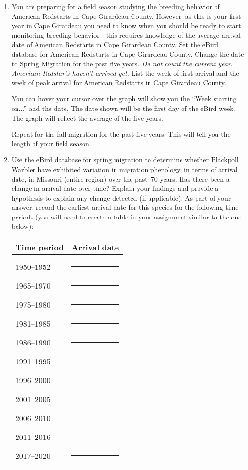 \documentclass[12pt]{article}
\begin{document}
\begin{enumerate}
\item You are preparing for a field season studying the breeding behavior
of American Redstarts in Cape Girardeau County. However, as this is your
first year in Cape Girardeau you need to know when you should be ready
to start monitoring breeding behavior---this requires knowledge of the
average arrival date of American Redstarts in Cape Girardeau County. Set
the eBird database for American Redstarts in Cape Girardeau County. Change the date to Spring Migration for the past five years. \emph{Do not count the current year. American Redstarts haven't arrived yet.} List
the week of first arrival and the week of peak arrival for American Redstarts in Cape Girardeau County.  

You can hover your cursor over the graph will show you the “Week starting on...” and the date. The date shown will be the first day of the eBird week. The graph will reflect the average of the five years.

Repeat for the fall migration for the past five years. This will tell you the length of your field season.


\item Use the eBird database for spring migration to determine
whether Blackpoll Warbler have exhibited variation in migration
phenology, in terms of arrival date, in Missouri (entire region) over the past~70 years.
Has there been a change in arrival date over time? Explain your findings
and provide a hypothesis to explain any change detected (if applicable).
As part of your answer, record the earliest arrival date for this
species for the following time periods (you will need to create a table
in your assignment similar to the one below):

\begin{longtable}[]{@{}ll@{}}
\toprule
Time period & Arrival date\tabularnewline
\midrule
\endhead
& \tabularnewline[-6pt]
1950–1952 & \rule{2cm}{0.4pt}\tabularnewline[0.5em]
1965–1970 & \rule{2cm}{0.4pt}\tabularnewline[0.5em]
1975–1980 & \rule{2cm}{0.4pt}\tabularnewline[0.5em]
1981–1985 & \rule{2cm}{0.4pt}\tabularnewline[0.5em]
1986–1990 & \rule{2cm}{0.4pt}\tabularnewline[0.5em]
1991–1995 & \rule{2cm}{0.4pt}\tabularnewline[0.5em]
1996–2000 & \rule{2cm}{0.4pt}\tabularnewline[0.5em]
2001–2005 & \rule{2cm}{0.4pt}\tabularnewline[0.5em]
2006–2010 & \rule{2cm}{0.4pt}\tabularnewline[0.5em]
2011–2016 & \rule{2cm}{0.4pt}\tabularnewline[0.5em]
2017–2020 & \rule{2cm}{0.4pt}\tabularnewline
\bottomrule
\end{longtable}


\end{enumerate}
\end{document}
